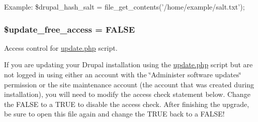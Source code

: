 Example: \$drupal\_\-hash\_\-salt = file\_\-get\_\-contents('/home/example/salt.txt'); \hypertarget{default_8settings_8php_afa06f20a6b90dec9a2573e779cd10b44}{
\subsubsection[{\$update\_\-free\_\-access}]{\setlength{\rightskip}{0pt plus 5cm}\$update\_\-free\_\-access = FALSE}}
\label{default_8settings_8php_afa06f20a6b90dec9a2573e779cd10b44}
Access control for \hyperlink{update_8php}{update.php} script.

If you are updating your Drupal installation using the \hyperlink{update_8php}{update.php} script but are not logged in using either an account with the \char`\"{}Administer software
 updates\char`\"{} permission or the site maintenance account (the account that was created during installation), you will need to modify the access check statement below. Change the FALSE to a TRUE to disable the access check. After finishing the upgrade, be sure to open this file again and change the TRUE back to a FALSE! 